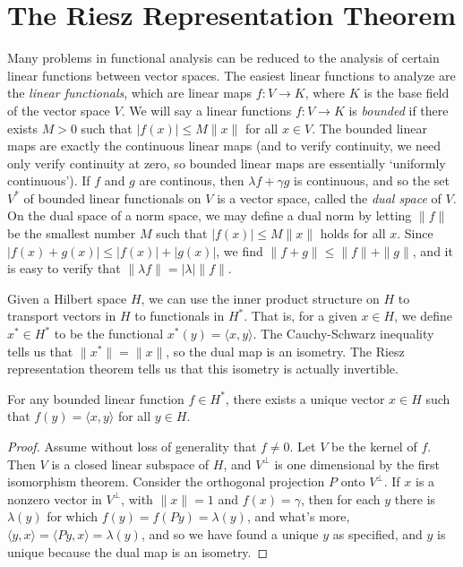 \section{The Riesz Representation Theorem}

Many problems in functional analysis can be reduced to the analysis of certain linear functions between vector spaces. The easiest linear functions to analyze are the \emph{linear functionals}, which are linear maps $f: V \to K$, where $K$ is the base field of the vector space $V$. We will say a linear functions $f: V \to K$ is \emph{bounded} if there exists $M > 0$ such that $|f(x)| \leq M \| x \|$ for all $x \in V$. The bounded linear maps are exactly the continuous linear maps (and to verify continuity, we need only verify continuity at zero, so bounded linear maps are essentially `uniformly continuous'). If $f$ and $g$ are continous, then $\lambda f + \gamma g$ is continuous, and so the set $V^*$ of bounded linear functionals on $V$ is a vector space, called the \emph{dual space} of $V$. On the dual space of a norm space, we may define a dual norm by letting $\| f \|$ be the smallest number $M$ such that $|f(x)| \leq M \| x \|$ holds for all $x$. Since $|f(x) + g(x)| \leq |f(x)| + |g(x)|$, we find $\| f + g \| \leq \| f \| + \| g \|$, and it is easy to verify that $\| \lambda f \| = |\lambda| \| f \|$.

Given a Hilbert space $H$, we can use the inner product structure on $H$ to transport vectors in $H$ to functionals in $H^*$. That is, for a given $x \in H$, we define $x^* \in H^*$ to be the functional $x^*(y) = \langle x, y \rangle$. The Cauchy-Schwarz inequality tells us that $\| x^* \| = \| x \|$, so the dual map is an isometry. The Riesz representation theorem tells us that this isometry is actually invertible.

\begin{theorem}[Riesz]
    For any bounded linear function $f \in H^*$, there exists a unique vector $x \in H$ such that $f(y) = \langle x, y \rangle$ for all $y \in H$.
\end{theorem}
\begin{proof}
    Assume without loss of generality that $f \neq 0$. Let $V$ be the kernel of $f$. Then $V$ is a closed linear subspace of $H$, and $V^\perp$ is one dimensional by the first isomorphism theorem. Consider the orthogonal projection $P$ onto $V^\perp$. If $x$ is a nonzero vector in $V^\perp$, with $\| x \| = 1$ and $f(x) = \gamma$, then for each $y$ there is $\lambda(y)$ for which $f(y) = f(Py) = \lambda(y)$, and what's more, $\langle y, x \rangle = \langle Py, x \rangle = \lambda(y)$, and so we have found a unique $y$ as specified, and $y$ is unique because the dual map is an isometry.
\end{proof}

